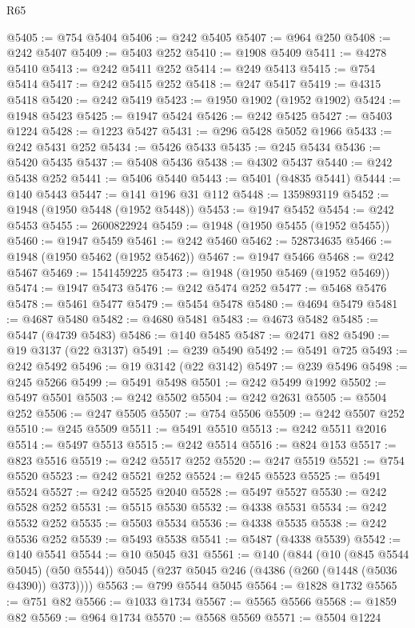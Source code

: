\begin{lexlean}{R65}
\begin{coremodule}
{@5405 := @754 @5404
@5406 := @242 @5405
@5407 := @964 @250
@5408 := @242 @5407
@5409 := @5403 @252
@5410 := @1908 @5409
@5411 := @4278 @5410
@5413 := @242 @5411 @252
@5414 := @249 @5413
@5415 := @754 @5414
@5417 := @242 @5415 @252
@5418 := @247 @5417
@5419 := @4315 @5418
@5420 := @242 @5419
@5423 := @1950 @1902 (@1952 @1902)
@5424 := @1948 @5423
@5425 := @1947 @5424
@5426 := @242 @5425
@5427 := @5403 @1224
@5428 := @1223 @5427
@5431 := @296 @5428 @5052 @1966
@5433 := @242 @5431 @252
@5434 := @5426 @5433
@5435 := @245 @5434
@5436 := @5420 @5435
@5437 := @5408 @5436
@5438 := @4302 @5437
@5440 := @242 @5438 @252
@5441 := @5406 @5440
@5443 := @5401 (@4835 @5441)
@5444 := @140 @5443
@5447 := @141 @196 @31 @112
@5448 := 1359893119
@5452 := @1948 (@1950 @5448 (@1952 @5448))
@5453 := @1947 @5452
@5454 := @242 @5453
@5455 := 2600822924
@5459 := @1948 (@1950 @5455 (@1952 @5455))
@5460 := @1947 @5459
@5461 := @242 @5460
@5462 := 528734635
@5466 := @1948 (@1950 @5462 (@1952 @5462))
@5467 := @1947 @5466
@5468 := @242 @5467
@5469 := 1541459225
@5473 := @1948 (@1950 @5469 (@1952 @5469))
@5474 := @1947 @5473
@5476 := @242 @5474 @252
@5477 := @5468 @5476
@5478 := @5461 @5477
@5479 := @5454 @5478
@5480 := @4694 @5479
@5481 := @4687 @5480
@5482 := @4680 @5481
@5483 := @4673 @5482
@5485 := @5447 (@4739 @5483)
@5486 := @140 @5485
@5487 := @2471 @82
@5490 := @19 @3137 (@22 @3137)
@5491 := @239 @5490
@5492 := @5491 @725
@5493 := @242 @5492
@5496 := @19 @3142 (@22 @3142)
@5497 := @239 @5496
@5498 := @245 @5266
@5499 := @5491 @5498
@5501 := @242 @5499 @1992
@5502 := @5497 @5501
@5503 := @242 @5502
@5504 := @242 @2631
@5505 := @5504 @252
@5506 := @247 @5505
@5507 := @754 @5506
@5509 := @242 @5507 @252
@5510 := @245 @5509
@5511 := @5491 @5510
@5513 := @242 @5511 @2016
@5514 := @5497 @5513
@5515 := @242 @5514
@5516 := @824 @153
@5517 := @823 @5516
@5519 := @242 @5517 @252
@5520 := @247 @5519
@5521 := @754 @5520
@5523 := @242 @5521 @252
@5524 := @245 @5523
@5525 := @5491 @5524
@5527 := @242 @5525 @2040
@5528 := @5497 @5527
@5530 := @242 @5528 @252
@5531 := @5515 @5530
@5532 := @4338 @5531
@5534 := @242 @5532 @252
@5535 := @5503 @5534
@5536 := @4338 @5535
@5538 := @242 @5536 @252
@5539 := @5493 @5538
@5541 := @5487 (@4338 @5539)
@5542 := @140 @5541
@5544 := @10 @5045 @31
@5561 := @140
    (@844
      (@10 (@845 @5544 @5045) (@50 @5544))
      @5045
      (@237 @5045 @246 (@4386 (@260 (@1448 (@5036 @4390)) @373))))
@5563 := @799 @5544 @5045
@5564 := @1828 @1732
@5565 := @751 @82
@5566 := @1033 @1734
@5567 := @5565 @5566
@5568 := @1859 @82
@5569 := @964 @1734
@5570 := @5568 @5569
@5571 := @5504 @1224
}
\end{coremodule}
\end{lexlean}
